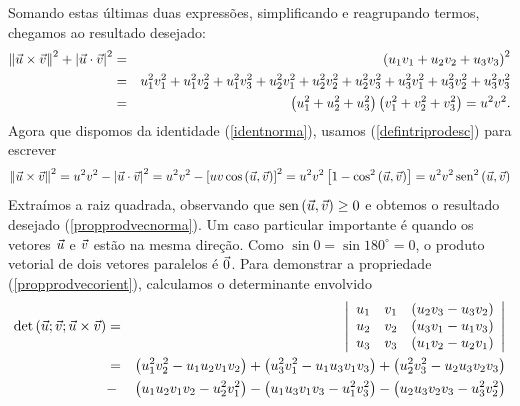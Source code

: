 Somando estas últimas duas expressões, simplificando e reagrupando termos, chegamos ao resultado desejado:
\begin{eqnarray*}
\left\|\vec{u}\times \vec{v}\right\|^2+\left|\vec{u}\cdot \vec{v}\right|^2&=&\left(u_1v_1+u_2v_2+u_3v_3\right)^2\\
&=&u_1^2v_1^2+u_1^2v_2^2+u_1^2v_3^2+u_2^2v_1^2+u_2^2v_2^2+u_2^2v_3^2+u_3^2v_1^2+u_3^2v_2^2+u_3^2v_3^2\\
&=&\left(u_1^2+u_2^2+u_3^2\right)\left(v_1^2+v_2^2+v_3^2\right)=u^2v^2.
\end{eqnarray*}
Agora que dispomos da identidade (\ref{identnorma}), usamos (\ref{defintriprodesc}) para escrever 
\begin{equation*}\left\|\vec{u}\times \vec{v}\right\|^2=u^2v^2-\left|\vec{u}\cdot \vec{v}\right|^2=u^2v^2-\left[uv\cos\left(\vec{u},\vec{v}\right)\right]^2=u^2v^2\left[1-\cos^2\left(\vec{u},\vec{v}\right)\right]=u^2v^2\operatorname{sen}^2\left(\vec{u},\vec{v}\right)
\end{equation*}
Extraímos a raiz quadrada, observando que $\operatorname{sen}\left(\vec{u},\vec{v}\right)\geq 0$ e obtemos o resultado desejado (\ref{propprodvecnorma}).
Um caso particular importante é quando os vetores $\vec{u}$ e $\vec{v}$ estão na mesma direção. Como $\sin 0= \sin 180^\circ=0$, o produto vetorial de dois vetores paralelos é $\vec{0}$.  
Para demonstrar a propriedade (\ref{propprodvecorient}), calculamos o determinante envolvido
\begin{eqnarray*}
\det\left(\vec{u};\vec{v};\vec{u}\times\vec{v}\right)&=&\left|
\begin{array}{ccc}
u_1 & v_1 & \left(u_2v_3-u_3v_2\right)\\  
u_2 & v_2 & \left(u_3v_1-u_1v_3\right)\\ 
u_3 & v_3 &  \left(u_1v_2-u_2v_1\right)
\end{array}
\right|\\
&=&\left(u_1^2v_2^2-u_1u_2v_1v_2\right)+\left(u_3^2v_1^2-u_1u_3v_1v_3\right)+\left(u_2^2v_3^2-u_2u_3v_2v_3\right)\\
&-&\left(u_1u_2v_1v_2-u_2^2v_1^2\right)-\left(u_1u_3v_1v_3-u_1^2v_3^2\right)-\left(u_2u_3v_2v_3-u_3^2v_2^2\right)
\end{eqnarray*}
